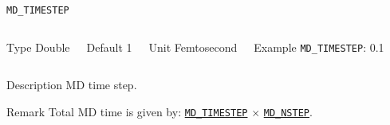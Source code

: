 \documentclass[xcolor=dvipsnames,t]{beamer}
\begin{document}
\begin{frame}[allowframebreaks]{\texttt{MD\_TIMESTEP}} \label{MD_TIMESTEP}
\vspace*{-12pt}
\begin{columns}
\begin{block}{Type}
Double
\end{block}

\begin{block}{Default}
1
\end{block}

\begin{block}{Unit}
Femtosecond
\end{block}

\begin{block}{Example}
\texttt{MD\_TIMESTEP}: 0.1
\end{block}
\end{columns}

\begin{block}{Description}
MD time step. 
\end{block}

\begin{block}{Remark}
Total MD time is given by:  \hyperlink{MD_TIMESTEP}{\texttt{MD\_TIMESTEP}} $\times$ \hyperlink{MD_NSTEP}{\texttt{MD\_NSTEP}}.
\end{block}

\end{frame}
\end{document}
